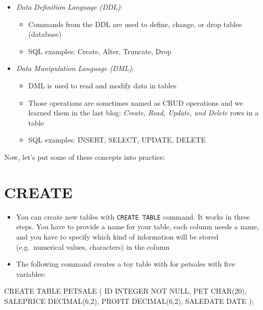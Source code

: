 \documentclass[
  letterpaper,
  DIV=11,
  numbers=noendperiod]{scrreprt}
\newenvironment{Shaded}{\begin{snugshade}}{\end{snugshade}}
\newcommand{\DataTypeTok}[1]{\textcolor[rgb]{0.68,0.00,0.00}{#1}}
\newcommand{\DecValTok}[1]{\textcolor[rgb]{0.68,0.00,0.00}{#1}}
\newcommand{\KeywordTok}[1]{\textcolor[rgb]{0.00,0.23,0.31}{#1}}
\newcommand{\NormalTok}[1]{\textcolor[rgb]{0.00,0.23,0.31}{#1}}
\providecommand{\tightlist}{%
  \setlength{\itemsep}{0pt}\setlength{\parskip}{0pt}}\usepackage{longtable,booktabs,array}
\begin{document}
\begin{itemize}
\tightlist
\item
  \emph{Data Definition Language (DDL)}:

  \begin{itemize}
  \tightlist
  \item
    Commands from the DDL are used to define, change, or drop tables
    (database)
  \item
    SQL examples: Create, Alter, Truncate, Drop
  \end{itemize}
\item
  \emph{Data Manipulation Language (DML)}:

  \begin{itemize}
  \tightlist
  \item
    DML is used to read and modify data in tables
  \item
    Those operations are sometimes named as CRUD operations and we
    learned them in the last blog: \emph{Create, Read, Update, and
    Delete} rows in a table
  \item
    SQL examples: INSERT, SELECT, UPDATE, DELETE
  \end{itemize}
\end{itemize}

Now, let's put some of these concepts into practice:

\hypertarget{create}{%
\section{CREATE}\label{create}}

\begin{itemize}
\tightlist
\item
  You can create new tables with \texttt{CREATE\ TABLE} command. It
  works in three steps. You have to provide a name for your table, each
  column needs a name, and you have to specify which kind of information
  will be stored (e.g.~numerical values, characters) in the column
\item
  The following command creates a toy table with for petsales with five
  variables:
\end{itemize}

\begin{Shaded}
\begin{Highlighting}[]
\KeywordTok{CREATE} \KeywordTok{TABLE}\NormalTok{ PETSALE (}
    \KeywordTok{ID} \DataTypeTok{INTEGER} \KeywordTok{NOT} \KeywordTok{NULL}\NormalTok{,}
\NormalTok{    PET }\DataTypeTok{CHAR}\NormalTok{(}\DecValTok{20}\NormalTok{),}
\NormalTok{    SALEPRICE }\DataTypeTok{DECIMAL}\NormalTok{(}\DecValTok{6}\NormalTok{,}\DecValTok{2}\NormalTok{),}
\NormalTok{    PROFIT }\DataTypeTok{DECIMAL}\NormalTok{(}\DecValTok{6}\NormalTok{,}\DecValTok{2}\NormalTok{),}
\NormalTok{    SALEDATE }\DataTypeTok{DATE}
\NormalTok{    );}
\end{Highlighting}
\end{Shaded}
\end{document}
